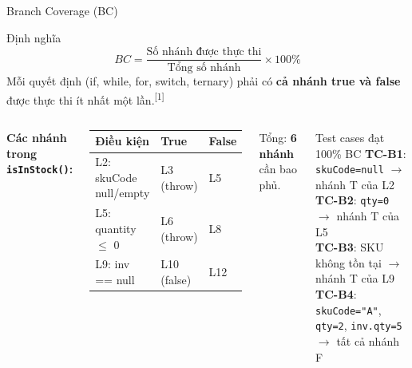 \documentclass[aspectratio=169,12pt]{beamer}
\newcommand{\sref}[1]{\textsuperscript{\scriptsize[#1]}}
\begin{document}
\begin{frame}[shrink=12]{Branch Coverage (BC)}
  \begin{block}{Định nghĩa}
    \[
      BC = \frac{\text{Số nhánh được thực thi}}{\text{Tổng số nhánh}} \times 100\%
    \]
    Mỗi quyết định (if, while, for, switch, ternary) phải có
    \textbf{cả nhánh true và false} được thực thi ít nhất một lần.\sref{1}
  \end{block}

  \vspace{0.4em}
  \begin{columns}
    \textbf{Các nhánh trong \texttt{isInStock()}:}
    \begin{center}
    \small
    \begin{tabular}{lll}
      \toprule
      \textbf{Điều kiện} & \textbf{True} & \textbf{False} \\
      \midrule
      L2: skuCode null/empty & L3 (throw) & L5 \\
      L5: quantity $\leq$ 0  & L6 (throw) & L8 \\
      L9: inv == null        & L10 (false) & L12 \\
      \bottomrule
    \end{tabular}
    \end{center}

    Tổng: \textbf{6 nhánh} cần bao phủ.

    \begin{exampleblock}{Test cases đạt 100\% BC}
      \textbf{TC-B1}: \texttt{skuCode=null} $\to$ nhánh T của L2\\[0.2em]
      \textbf{TC-B2}: \texttt{qty=0} $\to$ nhánh T của L5\\[0.2em]
      \textbf{TC-B3}: SKU không tồn tại $\to$ nhánh T của L9\\[0.2em]
      \textbf{TC-B4}: \texttt{skuCode="A"}, \texttt{qty=2},
      \texttt{inv.qty=5} $\to$ tất cả nhánh F\\
    \end{exampleblock}
  \end{columns}
\end{frame}
\end{document}
